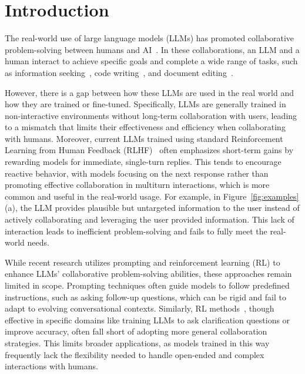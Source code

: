 \section{Introduction}
The real-world use of large language models (LLMs) has promoted collaborative problem-solving between humans and AI~\citep{rethinking_conv_agent, neural_approach, clarify_survey}. In these collaborations, an LLM and a human interact to achieve specific goals and complete a wide range of tasks, such as information seeking~\citep{inscit, clamber, cima,pacific}, code writing~\citep{benchmark_code_generate, codegen}, and document editing~\citep{interactive_text_gen}.

 However, there is a gap between how these LLMs are used in the real world and how they are trained or fine-tuned. 
Specifically, LLMs are generally trained in non-interactive environments without long-term collaboration with users, leading to a mismatch that limits their effectiveness and efficiency when collaborating with humans. 
Moreover, current LLMs trained using standard Reinforcement Learning from Human Feedback (RLHF)~\citep{rlhf} often emphasizes short-term gains by rewarding models for immediate, single-turn replies. This tends to encourage reactive behavior, with models focusing on the next response rather than promoting effective collaboration in multiturn interactions, which is more common and useful in the real-world usage. 
For example, in Figure~\ref{fig:examples} (a), the LLM provides plausible but untargeted information to the user instead of actively collaborating and leveraging the user provided information. 
This lack of interaction leads to inefficient problem-solving and fails to fully meet the real-world needs.

While recent research utilizes prompting and reinforcement learning (RL) to enhance LLMs' collaborative problem-solving abilities, these approaches remain limited in scope. Prompting techniques \citep{ask_more_informative_questions, clarify_when_necessary, clarifygpt, rephrase_and_respond} often guide models to follow predefined instructions, such as asking follow-up questions, which can be rigid and fail to adapt to evolving conversational contexts. Similarly, RL methods~\citep{baize, clarify_question_for_retrieval, learn_to_clarify, star_gate, self_correct}, though effective in specific domains like training LLMs to ask clarification questions or improve accuracy, often fall short of adopting more general collaboration strategies. This limits broader applications, as models trained in this way frequently lack the flexibility needed to handle open-ended and complex interactions with humans.

